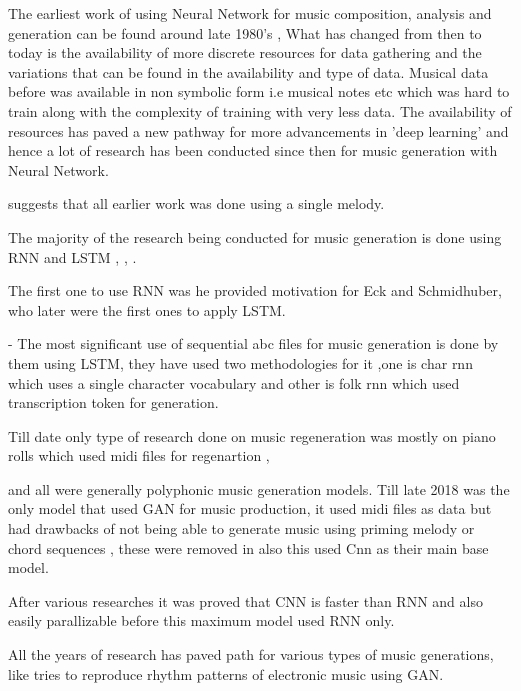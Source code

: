 \documentclass[oneside,12pt]{Classes/RoboticsLaTeX}
\begin{document}
\begin{abstracts}
  The earliest work of using Neural Network for music composition, analysis and  generation can be found around late 1980's \cite{mdolson}, What has changed from then to today is the availability of more discrete resources for data gathering and the variations that can be found in the availability and type of data. Musical data before was available in non symbolic form i.e musical notes etc which was hard to train along with the complexity of training with very less data. The availability of resources has paved a new pathway for more advancements in 'deep learning' \cite{deeplearning} and hence a lot of research has been conducted since then for music generation with Neural Network.

  \cite{jpon} suggests that all earlier work was done using  a single melody.
  
  The majority  of the research being conducted for music generation is done using RNN and LSTM  \cite{lstmtemporal}, \cite{rnnmelodies}, \cite{eck}.
  
  The first one to use RNN  was \cite{mozer} he provided motivation for  Eck and Schmidhuber, who later were the first ones to apply LSTM.\cite{eckschmid}
  
  \cite{abcmusic} - The most significant use of sequential abc files for music generation is done by them using LSTM, they have used two methodologies for it ,one is char rnn which uses a single character vocabulary and other is folk rnn which used transcription token for generation. 
  
  Till date only type of research done on music regeneration was mostly on piano rolls which used midi files for regenartion \cite{midinet} , \cite{musegan}
  
  \cite{polygan} and all were generally  polyphonic music generation models. Till late 2018 \cite{crnngan} was the only model that used GAN for music production, it used midi files as data but had drawbacks of not being able to generate music using priming melody or chord sequences , these were removed in \cite{midinet} also this used Cnn as their main base model. 
  
  After various researches it was proved that CNN is faster than RNN and also easily parallizable \cite{pxlcnn} before this maximum model used RNN only.
  
  All the years of research has paved path for various types of music generations, like \cite{edm} tries to reproduce rhythm patterns of electronic music using GAN.
  

\end{abstracts}
\end{document}
